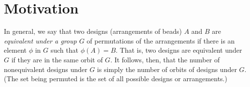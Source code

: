 \section{Motivation}

\begin{remark}
	In general, we say that two designs (arrangements of beads) $A$ and $B$ are \textit{equivalent under a group $G$} of permutations of the arrangements if there is an element $\phi$ in $G$ such that $\phi(A) = B$. That is, two designs are equivalent under $G$ if they are in the same orbit of $G$. It follows, then, that the number of nonequivalent designs under $G$ is simply the number of orbits of designs under $G$. (The set being permuted is the set of all possible designs or arrangements.)
\end{remark}
